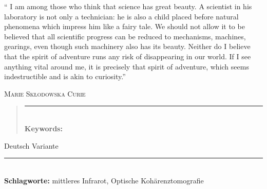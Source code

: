 \documentclass[
12pt, %
nolistspacing, %
liststotoc, %
headsepline, %
consistentlayout, %
]{MastersDoctoralThesis} %
\begin{document}



\newpage

\checktoopen
\noindent\enquote{%
I am among those who think that science has great beauty. A scientist in his laboratory is not only a technician: he is also a child placed before natural phenomena which impress him like a fairy tale. We should not allow it to be believed that all scientific progress can be reduced to mechanisms, machines, gearings, even though such machinery also has its beauty.
Neither do I believe that the spirit of adventure runs any risk of disappearing in our world. If I see anything vital around me, it is precisely that spirit of adventure, which seems indestructible and is akin to curiosity.}\bigbreak

\hfill \textsc{Marie Skłodowska Curie}


\begin{abstract}
\singlespacing

\lipsum[1-4]

\vfill
\begin{flushleft}
\rule{\textwidth}{0.8pt}\\
\noindent \normalsize \textbf{Keywords:} \keywordnames
\end{flushleft}
\clearpage
\end{abstract}

\begin{otherlanguage}{ngerman}
\begin{kurzfassung}
\singlespacing

Deutsch Variante
\lipsum[1-4]



\begin{flushleft}
\rule{\textwidth}{0.8pt}\\
\noindent \normalsize \textbf{Schlagworte:} mittleres Infrarot, Optische Kohärenztomografie

\end{flushleft}
\clearpage
\end{kurzfassung}
\end{otherlanguage}
\end{document}
